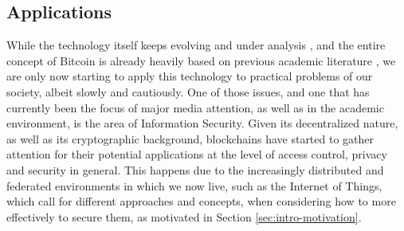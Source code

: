 \subsection{Applications}

While the technology itself keeps evolving and under analysis \cite{eyal_bitcoin-ng:_2016, wang_research_2018, gervais_security_2016, lin_survey_2017}, and the entire concept of Bitcoin is already heavily based on previous academic literature \cite{narayanan_bitcoins_2017}, we are only now starting to apply this technology to practical problems of our society, albeit slowly and cautiously. One of those issues, and one that has currently been the focus of major media attention, as well as in the academic environment, is the area of Information Security. Given its decentralized nature, as well as its cryptographic background, blockchains have started to gather attention for their potential applications at the level of access control, privacy and security in general. This happens due to the increasingly distributed and federated environments in which we now live, such as the Internet of Things, which call for different approaches and concepts, when considering how to more effectively to secure them, as motivated in Section \ref{sec:intro-motivation}.

